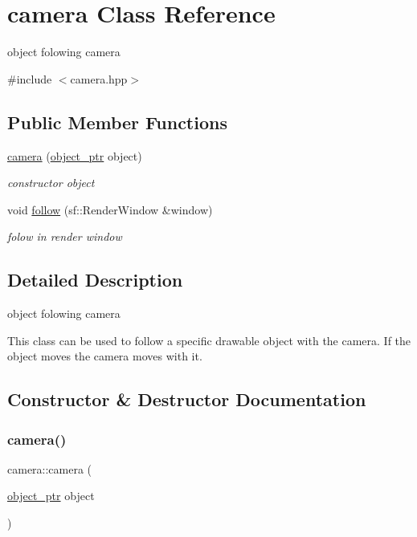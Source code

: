 \hypertarget{classcamera}{}\section{camera Class Reference}
\label{classcamera}


object folowing camera  




{\ttfamily \#include $<$camera.\+hpp$>$}

\subsection*{Public Member Functions}
\begin{DoxyCompactItemize}
\item 
\hyperlink{classcamera_ac3c67027b5f4f19c6f12db7d909930b5}{camera} (\hyperlink{typedefs_8hpp_aab5add95f06d2ba25dbfed8eb07274fa}{object\+\_\+ptr} object)
\begin{DoxyCompactList}\small\item\em constructor object \end{DoxyCompactList}\item 
void \hyperlink{classcamera_a1bb99501ba67453e0ca86f3c8aef5cb1}{follow} (sf\+::\+Render\+Window \&window)
\begin{DoxyCompactList}\small\item\em folow in render window \end{DoxyCompactList}\end{DoxyCompactItemize}


\subsection{Detailed Description}
object folowing camera 

This class can be used to follow a specific drawable object with the camera. If the object moves the camera moves with it. 

\subsection{Constructor \& Destructor Documentation}
\mbox{\label{classcamera_ac3c67027b5f4f19c6f12db7d909930b5}} 
\subsubsection{\texorpdfstring{camera()}{camera()}}
{\footnotesize\ttfamily camera\+::camera (\begin{DoxyParamCaption}\item[{\hyperlink{typedefs_8hpp_aab5add95f06d2ba25dbfed8eb07274fa}{object\+\_\+ptr}}]{object }\end{DoxyParamCaption})}



